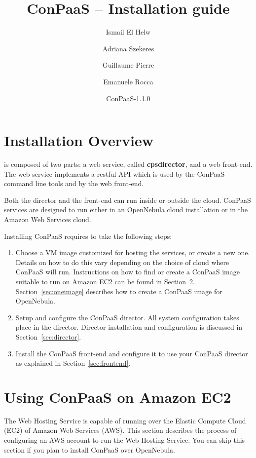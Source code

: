 \documentclass[10pt]{article}
\title{ConPaaS -- Installation guide\htmlonly{ [\xml{a href="installation.pdf"}pdf\xml{/a}]}}
\author{Ismail El Helw \and Adriana Szekeres \and Guillaume Pierre \and Emanuele Rocca}
\date{ConPaaS-1.1.0}
\begin{document}
\maketitle

\T\vfil
\T\tableofcontents
\T\vfil
\T\newpage

\section{Installation Overview}
\label{sec:overview}

 is composed of two parts: a web service,
called \textbf{cpsdirector}, and a web front-end. The web service implements a
restful API which is used by the ConPaaS command line tools and by the web
front-end.

Both the director and the front-end can run inside or outside the cloud.
ConPaaS services are designed to run either in an OpenNebula cloud
installation or in the Amazon Web Services cloud.

Installing ConPaaS requires to take the following steps:

\begin{enumerate}
\item Choose a VM image customized for hosting the services, or create a new
one. Details on how to do this vary depending on the choice of cloud where
ConPaaS will run. Instructions on how to find or create a ConPaaS image
suitable to run on Amazon EC2 can be found in Section~\ref{sec:ec2image}. 
Section~\ref{sec:oneimage} describes how to create a ConPaaS image for OpenNebula.
\item Setup and configure the ConPaaS director. All system
  configuration takes place in the director. Director installation and
  configuration is discussed in Section~\ref{sec:director}.
\item Install the ConPaaS front-end and configure it to use your ConPaaS
  director as explained in Section~\ref{sec:frontend}.
\end{enumerate}

\section{Using ConPaaS on Amazon EC2}
\label{sec:ec2image}

The Web Hosting Service is capable of running over the Elastic Compute
Cloud (EC2) of Amazon Web Services (AWS). This section describes the
process of configuring an AWS account to run the Web Hosting Service.
You can skip this section if you plan to install ConPaaS over
OpenNebula.
\end{document}
